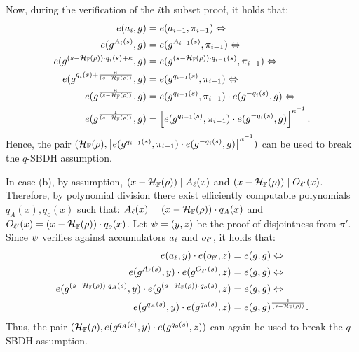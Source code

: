 Now, during the verification of the $i$th subset proof, it holds that:
\begin{align*}
    e(\textcolor{black}{a}_i,g) &= e(\textcolor{black}{a}_{i-1},\pi_{i-1}) \Leftrightarrow\\
    e(g^{A_i(s)},g) &= e(g^{A_{i-1}(s)},\pi_{i-1})\Leftrightarrow\\
    e(g^{(s-\mathcal{H}_{\mathbb{F}}(\rho))\cdot q_{i}(s) + \kappa},g) &= e(g^{(s-\mathcal{H}_{\mathbb{F}}(\rho))\cdot q_{i-1}(s)},\pi_{i-1})\Leftrightarrow\\
        e(g^{q_{i}(s) + \frac{\kappa}{(s-\mathcal{H}_{\mathbb{F}}(\rho))}},g) &= e(g^{q_{i-1}(s)},\pi_{i-1})\Leftrightarrow\\
        e(g^{\frac{\kappa}{(s-\mathcal{H}_{\mathbb{F}}(\rho))}},g) &= e(g^{q_{i-1}(s)},\pi_{i-1})\cdot e(g^{-q_{i}(s)},g)\Leftrightarrow\\
        e(g^{\frac{1}{(s-\mathcal{H}_{\mathbb{F}}(\rho))}},g) &= \left[ e(g^{q_{i-1}(s)},\pi_{i-1})\cdot e(g^{-q_{i}(s)},g)\right]^{\kappa^{-1}}.
\end{align*}
Hence, the pair $(\mathcal{H}_{\mathbb{F}}(\rho), \left[ e(g^{q_{i-1}(s)},\pi_{i-1})\cdot e(g^{-q_{i}(s)},g)\right]^{\kappa^{-1}})$ can be used to break the $q$-SBDH assumption.

In case (b), by assumption, $(x-\mathcal{H}_{\mathbb{F}}(\rho)) \mathrel| A_\ell(x)$ and $ (x-\mathcal{H}_{\mathbb{F}}(\rho)) \mathrel| O_{\ell'}(x)$. 
Therefore, by polynomial division there exist efficiently computable polynomials $q_A{(x)},q_o(x)$ such that: 
$A_{\ell}(x) = (x-\mathcal{H}_{\mathbb{F}}(\rho))\cdot q_A(x)$ and $O_{\ell'}(x) = (x-\mathcal{H}_{\mathbb{F}}(\rho))\cdot q_o(x)$.
Let $\textcolor{black}{\psi} = (y,z)$ be the proof of disjointness from $\pi'$.
Since $\textcolor{black}{\psi}$ verifies against accumulators $\textcolor{black}{a}_\ell$ and $o_{\ell'}$, it holds that:
\begin{align*}
    e(\textcolor{black}{a}_\ell,y) \cdot e(o_{\ell'},z) &= e(g,g) \Leftrightarrow\\
    e(g^{A_\ell(s)},y) \cdot e(g^{O_{\ell'}(s)},z) &= e(g,g) \Leftrightarrow\\
    e(g^{(s-\mathcal{H}_{\mathbb{F}}(\rho))\cdot q_A(s)},y) \cdot     e(g^{(s-\mathcal{H}_{\mathbb{F}}(\rho))\cdot q_o(s)},z) &= e(g,g)\Leftrightarrow\\
    e(g^{q_A(s)},y) \cdot e(g^{q_o(s)},z) &= e(g,g)^{\frac{1}{(s-\mathcal{H}_{\mathbb{F}}(\rho))}}.
\end{align*}
Thus, the pair $(\mathcal{H}_{\mathbb{F}}(\rho), e(g^{q_A(s)},y) \cdot e(g^{q_o(s)},z))$ can again be used to break the $q$-SBDH assumption.

